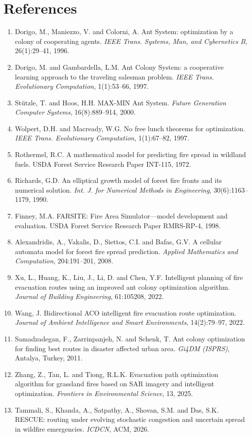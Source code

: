 \documentclass[11pt,a4paper]{article}
\begin{document}
\section*{References}
\begin{enumerate}[leftmargin=*,itemsep=2pt]
\item Dorigo, M., Maniezzo, V. and Colorni, A. Ant System: optimization by a colony of cooperating agents. \emph{IEEE Trans. Systems, Man, and Cybernetics B}, 26(1):29--41, 1996.
\item Dorigo, M. and Gambardella, L.M. Ant Colony System: a cooperative learning approach to the traveling salesman problem. \emph{IEEE Trans. Evolutionary Computation}, 1(1):53--66, 1997.
\item St\"utzle, T. and Hoos, H.H. MAX-MIN Ant System. \emph{Future Generation Computer Systems}, 16(8):889--914, 2000.
\item Wolpert, D.H. and Macready, W.G. No free lunch theorems for optimization. \emph{IEEE Trans. Evolutionary Computation}, 1(1):67--82, 1997.
\item Rothermel, R.C. A mathematical model for predicting fire spread in wildland fuels. USDA Forest Service Research Paper INT-115, 1972.
\item Richards, G.D. An elliptical growth model of forest fire fronts and its numerical solution. \emph{Int. J. for Numerical Methods in Engineering}, 30(6):1163--1179, 1990.
\item Finney, M.A. FARSITE: Fire Area Simulator---model development and evaluation. USDA Forest Service Research Paper RMRS-RP-4, 1998.
\item Alexandridis, A., Vakalis, D., Siettos, C.I. and Bafas, G.V. A cellular automata model for forest fire spread prediction. \emph{Applied Mathematics and Computation}, 204:191--201, 2008.
\item Xu, L., Huang, K., Liu, J., Li, D. and Chen, Y.F. Intelligent planning of fire evacuation routes using an improved ant colony optimization algorithm. \emph{Journal of Building Engineering}, 61:105208, 2022.
\item Wang, J. Bidirectional ACO intelligent fire evacuation route optimization. \emph{Journal of Ambient Intelligence and Smart Environments}, 14(2):79--97, 2022.
\item Samadzadegan, F., Zarrinpanjeh, N. and Schenk, T. Ant colony optimization for finding best routes in disaster affected urban area. \emph{Gi4DM (ISPRS)}, Antalya, Turkey, 2011.
\item Zhang, Z., Tan, L. and Tiong, R.L.K. Evacuation path optimization algorithm for grassland fires based on SAR imagery and intelligent optimization. \emph{Frontiers in Environmental Science}, 13, 2025.
\item Tammali, S., Khanda, A., Satpathy, A., Shovan, S.M. and Das, S.K. RESCUE: routing under evolving stochastic congestion and uncertain spread in wildfire emergencies. \emph{ICDCN}, ACM, 2026.
\end{enumerate}
\end{document}
